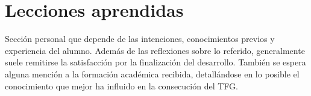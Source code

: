 \section{\forlnameref Lecciones aprendidas}
\label{sec:lessonsLearnt}

\begin{shaded}
Sección personal que depende de las intenciones, conocimientos previos y experiencia del alumno. Además de las reflexiones sobre lo referido, generalmente suele remitirse la satisfacción por la finalización del desarrollo. También se espera alguna mención a la formación académica recibida, detallándose en lo posible el conocimiento que mejor ha influido en la consecución del \ac{TFG}.
\end{shaded}